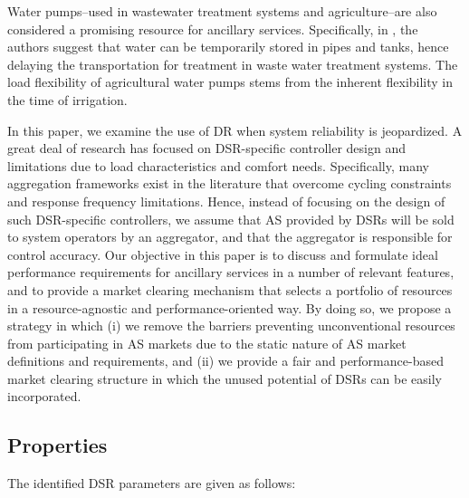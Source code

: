 Water pumps--used in wastewater treatment systems and agriculture--are also considered a promising resource for ancillary services. Specifically, in \cite{halvgaard2014waste}, the authors suggest that water can be temporarily stored in pipes and tanks, hence delaying the transportation for treatment in waste water treatment systems. The load flexibility of agricultural water pumps stems from the inherent flexibility in the time of irrigation.

In this paper, we examine the use of DR when system reliability is jeopardized. A great deal of research has focused on DSR-specific controller design and limitations due to load characteristics and comfort needs. Specifically, many aggregation frameworks exist in the literature that overcome cycling constraints and response frequency limitations. Hence, instead of focusing on the design of such DSR-specific controllers, we assume that AS provided by DSRs will be sold to system operators by an aggregator, and that the aggregator is responsible for control accuracy. 
Our objective in this paper is to discuss and formulate ideal performance requirements for ancillary services in a number of relevant features, and to provide a market clearing mechanism that selects a portfolio of resources in a resource-agnostic and performance-oriented way. By doing so, we propose a strategy in which (i) we remove the barriers preventing unconventional resources from participating in AS markets due to the static nature of AS market definitions and requirements, and (ii) we provide a fair and performance-based market clearing structure in which the unused potential of DSRs can be easily incorporated.

\subsection{Properties}
The identified DSR parameters are given as follows:

